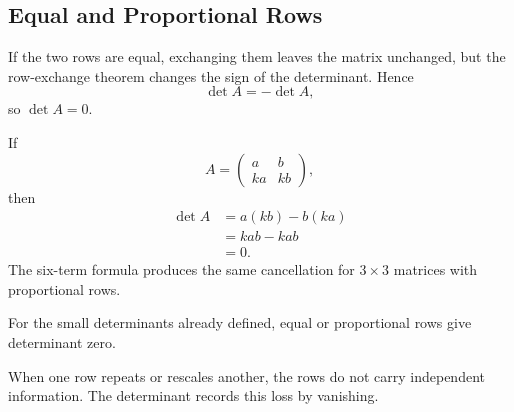 \subsection{Equal and Proportional Rows}

If the two rows are equal, exchanging them leaves the matrix unchanged, but the row-exchange theorem changes the sign of the determinant. Hence
\[
\det A=-\det A,
\]
so $\det A=0$.

\begin{proofbox}
If
\[
A=\begin{pmatrix}a&b\\ka&kb\end{pmatrix},
\]
then
\begin{align*}
\det A
&=a(kb)-b(ka)\\
&=kab-kab\\
&=0.
\end{align*}
The six-term formula produces the same cancellation for $3\times3$ matrices with proportional rows.
\end{proofbox}

\begin{theorembox}
For the small determinants already defined, equal or proportional rows give determinant zero.
\end{theorembox}

\begin{interpretationbox}
When one row repeats or rescales another, the rows do not carry independent information. The determinant records this loss by vanishing.
\end{interpretationbox}
